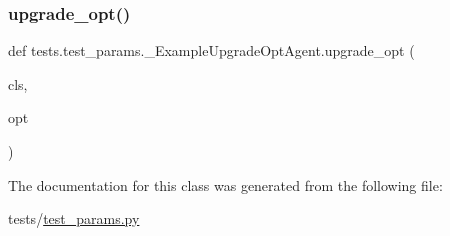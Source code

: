 \subsubsection{\texorpdfstring{upgrade\+\_\+opt()}{upgrade\_opt()}}
{\footnotesize\ttfamily def tests.\+test\+\_\+params.\+\_\+\+Example\+Upgrade\+Opt\+Agent.\+upgrade\+\_\+opt (\begin{DoxyParamCaption}\item[{}]{cls,  }\item[{}]{opt }\end{DoxyParamCaption})}



The documentation for this class was generated from the following file\+:\begin{DoxyCompactItemize}
\item 
tests/\hyperlink{test__params_8py}{test\+\_\+params.\+py}\end{DoxyCompactItemize}
